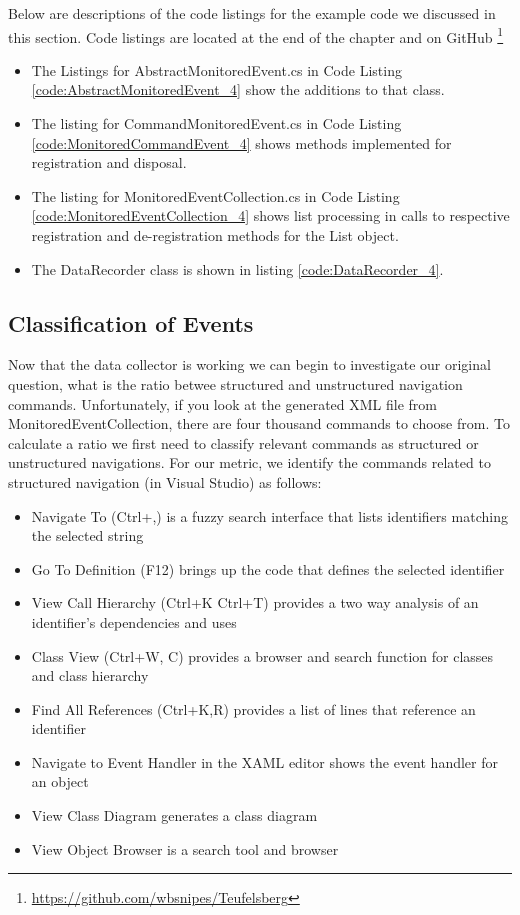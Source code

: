 Below are descriptions of the code listings for the example code we discussed in this section.  Code listings are located at the end of the chapter and on GitHub \footnote{\url{https://github.com/wbsnipes/Teufelsberg}}
\begin{itemize}
\item
The Listings for AbstractMonitoredEvent.cs in Code Listing \ref{code:AbstractMonitoredEvent_4}  show the additions to that class.  
\item
The listing for CommandMonitoredEvent.cs in Code Listing \ref{code:MonitoredCommandEvent_4} shows methods implemented for registration and disposal.
\item
The listing for MonitoredEventCollection.cs in Code Listing \ref{code:MonitoredEventCollection_4} shows list processing in calls to respective registration and de-registration methods for the List object.
\item
The DataRecorder class is shown in listing \ref{code:DataRecorder_4}.
\end{itemize}



\subsection{Classification of Events}
Now that the data collector is working we can begin to investigate our original question, what is the ratio betwee structured and unstructured navigation commands.  Unfortunately, if you look at the generated XML file from MonitoredEventCollection, there are four thousand commands to choose from. To calculate a ratio we first need to classify relevant commands as structured or unstructured navigations. 
For our metric,  we identify the  commands related to structured navigation (in Visual Studio) as follows:
\begin{itemize}
\item
 Navigate To (Ctrl+,) is a fuzzy search interface that lists identifiers matching the selected string
\item Go To Definition (F12) brings up the code that defines the selected identifier
\item View Call Hierarchy (Ctrl+K Ctrl+T) provides a two way analysis of an identifier's dependencies and uses
\item Class View (Ctrl+W, C) provides a browser and search function for classes and class hierarchy
\item Find All References (Ctrl+K,R) provides a list of lines that reference an identifier
\item Navigate to Event Handler in the XAML editor shows the event handler for an object
\item View Class Diagram generates a class diagram
\item View Object Browser is a search tool and browser
\end{itemize}

